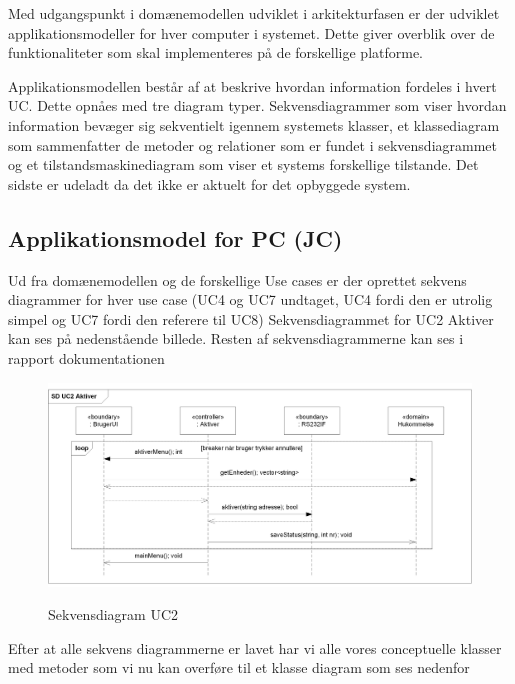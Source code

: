 Med udgangspunkt i domænemodellen udviklet i arkitekturfasen er der udviklet applikationsmodeller for hver computer i systemet. Dette giver overblik over de funktionaliteter som skal implementeres på de forskellige platforme.

Applikationsmodellen består af at beskrive hvordan information fordeles i hvert UC. Dette opnåes med tre diagram typer. Sekvensdiagrammer som viser hvordan information bevæger sig sekventielt igennem systemets klasser, et klassediagram som sammenfatter de metoder og relationer som er fundet i sekvensdiagrammet og et tilstandsmaskinediagram som viser et systems forskellige tilstande. Det sidste er udeladt da det ikke er aktuelt for det opbyggede system.

%
%
\subsection{Applikationsmodel for PC (JC)}

Ud fra domænemodellen og de forskellige Use cases er der oprettet sekvens diagrammer for hver use case (UC4 og UC7 undtaget, UC4 fordi den er utrolig simpel og UC7 fordi den referere til UC8) Sekvensdiagrammet for UC2 Aktiver kan ses på nedenstående billede. Resten af sekvensdiagrammerne kan ses i rapport dokumentationen

\begin{figure}[htbp] \centering
{\includegraphics[width=\textwidth]{billeder/uml/PC_UC2}}
\caption{Sekvensdiagram UC2}
\label{lab:Sekvensdiagram UC2}
\end{figure}

Efter at alle sekvens diagrammerne er lavet har vi alle vores conceptuelle klasser med metoder som vi nu kan overføre til et klasse diagram som ses nedenfor

